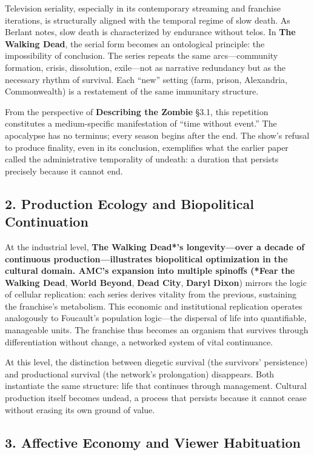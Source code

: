\documentclass[11pt]{article}
\begin{document}
Television seriality, especially in its contemporary streaming and franchise iterations, is structurally aligned with the temporal regime of slow death.  As Berlant notes, slow death is characterized by endurance without telos.  In \textbf{The Walking Dead}, the serial form becomes an ontological principle: the impossibility of conclusion.  The series repeats the same arcs—community formation, crisis, dissolution, exile—not as narrative redundancy but as the necessary rhythm of survival.  Each “new” setting (farm, prison, Alexandria, Commonwealth) is a restatement of the same immunitary structure.  

From the perspective of \textbf{Describing the Zombie} §3.1, this repetition constitutes a medium-specific manifestation of “time without event.”  The apocalypse has no terminus; every season begins after the end.  The show’s refusal to produce finality, even in its conclusion, exemplifies what the earlier paper called the administrative temporality of undeath: a duration that persists precisely because it cannot end.  
\subsection*{2. Production Ecology and Biopolitical Continuation}
\label{sec:org07d8c6e}

At the industrial level, \textbf{The Walking Dead*’s longevity—over a decade of continuous production—illustrates biopolitical optimization in the cultural domain.  AMC’s expansion into multiple spinoffs (*Fear the Walking Dead}, \textbf{World Beyond}, \textbf{Dead City}, \textbf{Daryl Dixon}) mirrors the logic of cellular replication: each series derives vitality from the previous, sustaining the franchise’s metabolism.  This economic and institutional replication operates analogously to Foucault’s population logic—the dispersal of life into quantifiable, manageable units.  The franchise thus becomes an organism that survives through differentiation without change, a networked system of vital continuance.  

At this level, the distinction between diegetic survival (the survivors’ persistence) and productional survival (the network’s prolongation) disappears.  Both instantiate the same structure: life that continues through management.  Cultural production itself becomes undead, a process that persists because it cannot cease without erasing its own ground of value.  
\subsection*{3. Affective Economy and Viewer Habituation}
\label{sec:orga85faf8}
\end{document}
